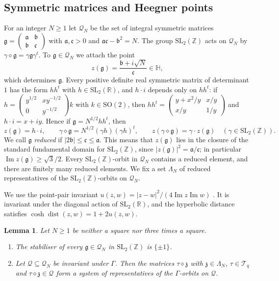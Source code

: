 \documentclass[11pt]{amsart}
\newtheorem{lemma}[theorem]{Lemma}
\theoremstyle{remark}
\theoremstyle{definition}
\numberwithin{equation}{section}
\newcommand{\Qc}{\mathcal{Q}}
\newcommand{\Tc}{\mathcal{T}}
\newcommand{\Z}{\mathbb{Z}}
\newcommand{\R}{\mathbb{R}}
\newcommand{\Hb}{\mathbb{H}}
\newcommand{\ga}{\mathfrak{a}}
\newcommand{\gb}{\mathfrak{b}}
\newcommand{\gc}{\mathfrak{c}}
\newcommand{\fg}{\mathfrak{g}}
\newcommand{\gz}{\mathfrak{z}}
\newcommand{\SL}{\mathrm{SL}}
\begin{document}
\subsection{Symmetric matrices and Heegner points}
For an integer $N\ge1$ let $\Qc_N$ be the set of integral symmetric matrices $\fg=\left(\begin{smallmatrix}\ga&\gb\\ \gb&\gc\end{smallmatrix}\right)$ with $\ga,\gc>0$ and $\ga\gc-\gb^2=N$. The group $\SL_2(\Z)$ acts on $\Qc_N$ by $\gamma\diamond\fg=\gamma\fg\gamma^{t}$. To $\fg\in\Qc_N$ we attach the point
\[
z(\fg)=\frac{\gb+i\sqrt N}{\gc}\in\Hb ,
\]
which determines $\fg$. Every positive definite real symmetric matrix of determinant $1$ has the form $hh^t$ with $h\in\SL_2(\R)$, and $h\cdot i$ depends only on $hh^t$: if $h=\left(\begin{smallmatrix}y^{1/2}&xy^{-1/2}\\0&y^{-1/2}\end{smallmatrix}\right)k$ with $k\in\mathrm{SO}(2)$, then $hh^t=\left(\begin{smallmatrix}y+x^2/y&x/y\\x/y&1/y\end{smallmatrix}\right)$ and $h\cdot i=x+iy$. Hence if $\fg=N^{1/2}hh^t$, then
\begin{equation}\label{eq:zg}
z(\fg)=h\cdot i,\qquad \gamma\diamond\fg=N^{1/2}(\gamma h)(\gamma h)^t,\qquad z(\gamma\diamond\fg)=\gamma\cdot z(\fg)\quad(\gamma\in\SL_2(\Z)).
\end{equation}
We call $\fg$ \emph{reduced} if $|2\gb|\le\gc\le\ga$. This means that $z(\fg)$ lies in the closure of the standard fundamental domain for $\SL_2(\Z)$, since $|z(\fg)|^2=\ga/\gc$; in particular $\operatorname{Im}z(\fg)\ge\sqrt3/2$. Every $\SL_2(\Z)$-orbit in $\Qc_N$ contains a reduced element, and there are finitely many reduced elements. We fix a set $\Lambda_N$ of reduced representatives of the $\SL_2(\Z)$-orbits on $\Qc_N$.

We use the point-pair invariant $u(z,w)=|z-w|^2/(4\operatorname{Im}z\operatorname{Im}w)$ \cite[Ch.~1]{Iw}. It is invariant under the diagonal action of $\SL_2(\R)$, and the hyperbolic distance satisfies $\cosh\operatorname{dist}(z,w)=1+2u(z,w)$.

\begin{lemma}\label{lem:param}
Let $N\ge1$ be neither a square nor three times a square.
\begin{enumerate}
\item[(a)] The stabiliser of every $\fg\in\Qc_N$ in $\SL_2(\Z)$ is $\{\pm1\}$.
\item[(b)] Let $\Qc\subseteq\Qc_N$ be invariant under $\Gamma$. Then the matrices $\tau\diamond\gz$ with $\gz\in\Lambda_N$, $\tau\in\Tc_q$ and $\tau\diamond\gz\in\Qc$ form a system of representatives of the $\Gamma$-orbits on $\Qc$.
\end{enumerate}
\end{lemma}
\end{document}
